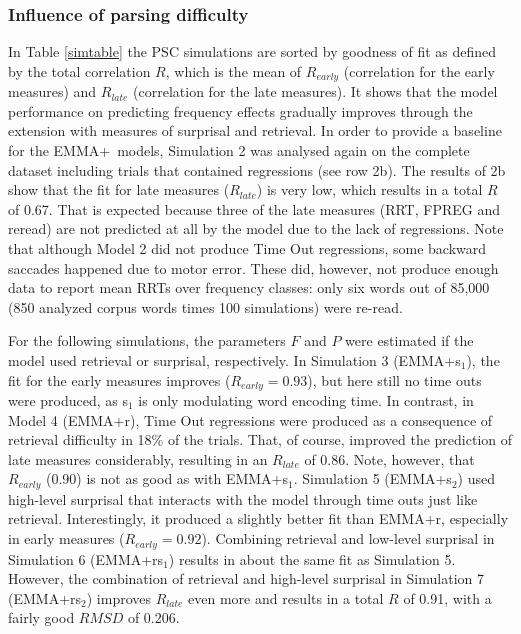 \documentclass{cambridge7A}\usepackage[]{graphicx}\usepackage[]{color}
\begin{document}
\subsubsection{Influence of parsing difficulty}
In Table \ref{simtable} the PSC simulations are sorted by goodness of fit as defined by the total correlation $R$, which is the mean of $R_{early}$ (correlation for the early measures) and $R_{late}$ (correlation for the late measures).  It shows that the model performance on predicting frequency effects gradually improves through the extension with measures of surprisal and retrieval.
In order to provide a baseline for the EMMA+~models, Simulation 2 was analysed again on the complete dataset including trials that contained regressions (see row 2b). 
The results of 2b show that the fit for late measures ($R_{late}$) is very low, which results in a total $R$ of 0.67. That is expected because three of the late measures (RRT, FPREG and reread) are not predicted at all by the model due to the lack of regressions.  Note that although Model 2 did not produce  Time Out regressions, some backward saccades happened due to motor error.  These did, however, not produce enough data to report mean RRTs over frequency classes: only six words out of 85,000 (850 analyzed corpus words times 100 simulations) were re-read. 

For the following simulations, the parameters $F$ and $P$ were estimated if the model used retrieval or surprisal, respectively.
In Simulation 3 (EMMA+s$_1$), the fit for the early measures improves ($R_{early}=0.93$), but here still no time outs were produced, as s$_1$ is only modulating word encoding time.  In contrast, in Model 4 (EMMA+r), Time Out regressions were produced as a consequence of retrieval difficulty in 18\% of the trials.  That, of course, improved the prediction of late measures considerably, resulting in an $R_{late}$ of 0.86.  Note, however, that $R_{early}$ (0.90) is not as good as with EMMA+s$_1$.  
Simulation 5 (EMMA+s$_2$) used high-level surprisal that interacts with the model through time outs just like retrieval.  Interestingly, it produced a slightly better fit than EMMA+r, especially in early measures ($R_{early}=0.92$).  Combining retrieval and low-level surprisal in Simulation 6 (EMMA+rs$_1$) results in about the same fit as Simulation 5.  However, the combination of retrieval and high-level surprisal in Simulation 7 (EMMA+rs$_2$) improves $R_{late}$ even more and results in a total $R$ of 0.91, with a fairly good $RMSD$ of 0.206. 
\end{document}
